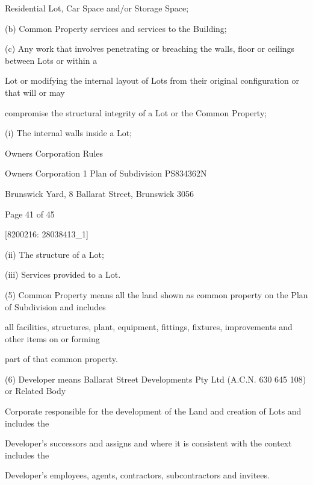 \documentclass{article}
\begin{document}
{\fontsize{10.02}{1}Residential Lot, Car Space and/or Storage Space; }

{\fontsize{9.962}{1}(b) Common Property services and services to the Building; }

{\fontsize{9.962}{1}(c) Any work that involves penetrating or breaching the walls, floor or ceilings between Lots or within a }

{\fontsize{10.02}{1}Lot or modifying the internal layout of Lots from their original configuration or that will or may }

{\fontsize{10.02}{1}compromise the structural integrity of a Lot or the Common Property; }

{\fontsize{9.962}{1}(i) The internal walls inside a Lot; }

\newpage





{\fontsize{9}{1}Owners Corporation Rules }

{\fontsize{9}{1}Owners Corporation 1 Plan of Subdivision PS834362N }

{\fontsize{9}{1}Brunswick Yard, 8 Ballarat Street, Brunswick 3056 }


{\fontsize{9}{1}Page 41  of 45 }



{\fontsize{7.02}{1}[8200216: 28038413\_1] }

{\fontsize{9.962}{1}(ii) The structure of a Lot; }

{\fontsize{9.962}{1}(iii) Services provided to a Lot. }


{\fontsize{9.962}{1}(5) Common Property means all the land shown as common property on the Plan of Subdivision and includes }

{\fontsize{10.02}{1}all facilities, structures, plant, equipment, fittings, fixtures, improvements and other items on or forming }

{\fontsize{10.02}{1}part of that common property. }

{\fontsize{9.962}{1}(6) Developer means Ballarat Street Developments Pty Ltd (A.C.N. 630 645 108) or Related Body }

{\fontsize{10.02}{1}Corporate responsible for the development of the Land and creation of Lots and includes the }

{\fontsize{10.02}{1}Developer’s successors and assigns and where it is consistent with the context includes the }

{\fontsize{10.02}{1}Developer’s employees, agents, contractors, subcontractors and invitees. }
\end{document}
